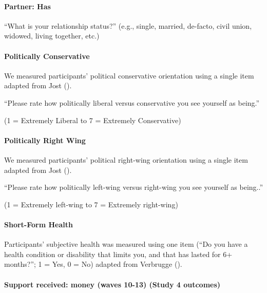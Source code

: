 \documentclass[
  singlecolumn]{article}
\let\oldparagraph\paragraph
\renewcommand{\paragraph}[1]{\oldparagraph{#1}\mbox{}}
\begin{document}
\paragraph{Partner: Has}\label{partner-has}

``What is your relationship status?'' (e.g., single, married, de-facto,
civil union, widowed, living together, etc.)

\paragraph{Politically Conservative}\label{politically-conservative}

We measured participants' political conservative orientation using a
single item adapted from Jost ().

``Please rate how politically liberal versus conservative you see
yourself as being.''

(1 = Extremely Liberal to 7 = Extremely Conservative)

\paragraph{Politically Right Wing}\label{politically-right-wing}

We measured participants' political right-wing orientation using a
single item adapted from Jost ().

``Please rate how politically left-wing versus right-wing you see
yourself as being..''

(1 = Extremely left-wing to 7 = Extremely right-wing)

\paragraph{Short-Form Health}\label{short-form-health}

Participants' subjective health was measured using one item (``Do you
have a health condition or disability that limits you, and that has
lasted for 6+ months?''; 1 = Yes, 0 = No) adapted from Verbrugge
().

\paragraph{Support received: money (waves 10-13) (Study 4
outcomes)}\label{support-received-money-waves-10-13-study-4-outcomes}
\end{document}
